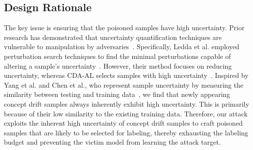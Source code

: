 \documentclass[conference,compsoc]{IEEEtran} %
\begin{document}
\subsection{Design Rationale}
The key issue is ensuring that the poisoned samples have high uncertainty.
Prior research has demonstrated that uncertainty quantification techniques are vulnerable to manipulation by adversaries~\cite{Ledda_2023_ICCV}.
Specifically, Ledda et al. employed perturbation search techniques to find the minimal perturbations capable of altering a sample's uncertainty~\cite{Ledda_2023_ICCV}.
However, their method focuses on reducing uncertainty, whereas CDA-AL selects samples with high uncertainty~\cite{2023-Usenix-chenyizhen}.
Inspired by Yang et al. and Chen et al., who represent sample uncertainty by measuring the similarity between testing and training data~\cite{2021-Usenix-CDAE,2023-Usenix-chenyizhen}, we find that newly appearing concept drift samples always inherently exhibit high uncertainty.
This is primarily because of their low similarity to the existing training data.
Therefore, our attack exploits the inherent high uncertainty of concept drift samples to craft poisoned samples that are likely to be selected for labeling, thereby exhausting the labeling budget and preventing the victim model from learning the attack target.
\end{document}
